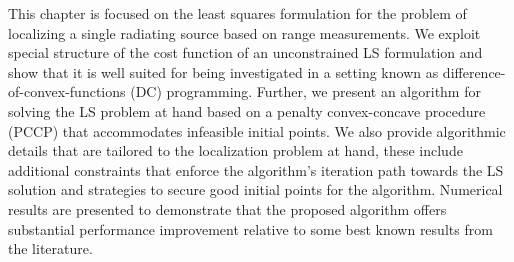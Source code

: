 This chapter is focused on the least squares formulation for the problem of localizing a single radiating source based on range measurements.   We exploit special structure of the cost function of an unconstrained LS formulation and show that it is well suited for being investigated in a setting known as difference-of-convex-functions (DC) programming. Further, we present an algorithm for solving the LS problem at hand based on a penalty convex-concave procedure (PCCP) \cite{LBoyd} that accommodates infeasible initial points. We also provide algorithmic details that are tailored to the localization problem at hand, these include additional constraints that enforce the algorithm’s  iteration path towards the LS solution and strategies to secure good initial points for the algorithm. Numerical results are presented to demonstrate that the proposed algorithm offers substantial performance improvement relative to some best known results from the literature.


